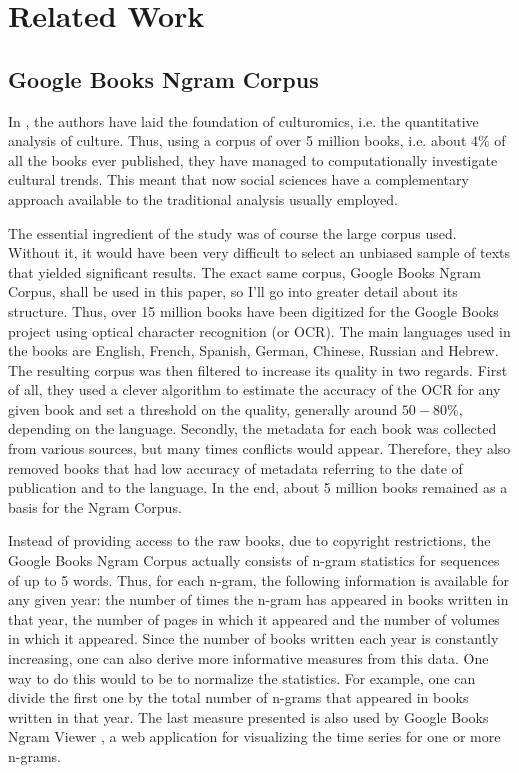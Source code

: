 \chapter{Related Work}
\label{chapter:relatedwork}

\section{Google Books Ngram Corpus}
\label{sec:ngram-corpus}

In \cite{Michel14012011}, the authors have laid the foundation of culturomics, i.e. the quantitative analysis of culture. Thus, using a corpus of over 5 million books, i.e. about $4 \%$ of all the books ever published, they have managed to computationally investigate cultural trends. This meant that now social sciences have a complementary approach available to the traditional analysis usually employed.

The essential ingredient of the study was of course the large corpus used. Without it, it would have been very difficult to select an unbiased sample of texts that yielded significant results. The exact same corpus, Google Books Ngram Corpus, shall be used in this paper, so I'll go into greater detail about its structure. Thus, over 15 million books have been digitized for the Google Books project using optical character recognition (or OCR). The main languages used in the books are English, French, Spanish, German, Chinese, Russian and Hebrew. The resulting corpus was then filtered to increase its quality in two regards. First of all, they used a clever algorithm to estimate the accuracy of the OCR for any given book and set a threshold on the quality, generally around $50 - 80 \%$, depending on the language. Secondly, the metadata for each book was collected from various sources, but many times conflicts would appear. Therefore, they also removed books that had low accuracy of metadata referring to the date of publication and to the language. In the end, about 5 million books remained as a basis for the Ngram Corpus.

Instead of providing access to the raw books, due to copyright restrictions, the Google Books Ngram Corpus actually consists of n-gram statistics for sequences of up to 5 words. Thus, for each n-gram, the following information is available for any given year: the number of times the n-gram has appeared in books written in that year, the number of pages in which it appeared and the number of volumes in which it appeared. Since the number of books written each year is constantly increasing, one can also derive more informative measures from this data. One way to do this would to be to normalize the statistics. For example, one can divide the first one by the total number of n-grams that appeared in books written in that year. The last measure presented is also used by Google Books Ngram Viewer \cite{ngramviewer}, a web application for visualizing the time series for one or more n-grams.

